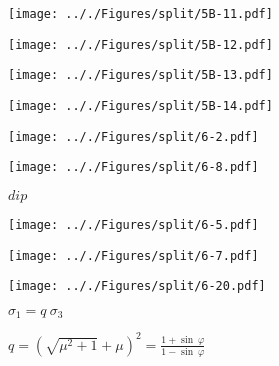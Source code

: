 \documentclass[onecolumn,11pt]{report}
\def\lthtmlcheckvsize{\ifdim\ht\sizebox<\vsize 
  \ifdim\wd\sizebox<\hsize\expandafter\hfill\fi \expandafter\vfill
  \else\expandafter\vss\fi}%
\begin{document}
{\newpage\clearpage
{}%
\texttt{[image: .././Figures/split/5B-11.pdf]}%
\lthtmlpictureZ
\lthtmlcheckvsize\clearpage}

{\newpage\clearpage
{}%
\texttt{[image: .././Figures/split/5B-12.pdf]}%
\lthtmlpictureZ
\lthtmlcheckvsize\clearpage}

{\newpage\clearpage
{}%
\texttt{[image: .././Figures/split/5B-13.pdf]}%
\lthtmlpictureZ
\lthtmlcheckvsize\clearpage}

{\newpage\clearpage
{}%
\texttt{[image: .././Figures/split/5B-14.pdf]}%
\lthtmlpictureZ
\lthtmlcheckvsize\clearpage}

{\newpage\clearpage
{}%
\texttt{[image: .././Figures/split/6-2.pdf]}%
\lthtmlpictureZ
\lthtmlcheckvsize\clearpage}

{\newpage\clearpage
{}%
\texttt{[image: .././Figures/split/6-8.pdf]}%
\lthtmlpictureZ
\lthtmlcheckvsize\clearpage}

{\newpage\clearpage
{}%
$ dip$%
\lthtmlindisplaymathZ
\lthtmlcheckvsize\clearpage}

{\newpage\clearpage
{}%
\texttt{[image: .././Figures/split/6-5.pdf]}%
\lthtmlpictureZ
\lthtmlcheckvsize\clearpage}

{\newpage\clearpage
{}%
\texttt{[image: .././Figures/split/6-7.pdf]}%
\lthtmlpictureZ
\lthtmlcheckvsize\clearpage}

{\newpage\clearpage
{}%
\texttt{[image: .././Figures/split/6-20.pdf]}%
\lthtmlpictureZ
\lthtmlcheckvsize\clearpage}

{\newpage\clearpage
{}%
$\displaystyle \sigma_1 = q \: \sigma_3$%
\lthtmlindisplaymathZ
\lthtmlcheckvsize\clearpage}

{\newpage\clearpage
{}%
$\displaystyle q = \left( \sqrt{\mu^2 +1} + \mu \right) ^2 = \frac{1+\sin \: \varphi}{1-\sin \: \varphi}$%
\lthtmlindisplaymathZ
\lthtmlcheckvsize\clearpage}
\end{document}
